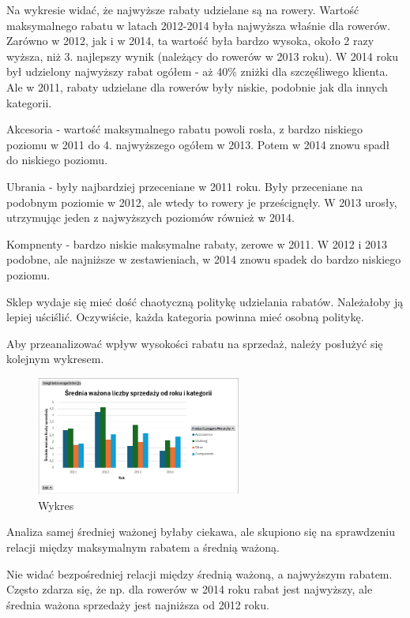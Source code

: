 \documentclass[a4paper,12pt]{article}
\begin{document}
Na wykresie widać, że najwyższe rabaty udzielane są na rowery. Wartość maksymalnego rabatu w latach 2012-2014 była najwyższa właśnie dla rowerów. Zarówno w 2012, jak i w 2014, ta wartość była bardzo wysoka, około 2 razy wyższa, niż 3. najlepszy wynik (należący do rowerów w 2013 roku). W 2014 roku był udzielony najwyższy rabat ogółem - aż 40\% zniżki dla szczęśliwego klienta.
Ale w 2011, rabaty udzielane dla rowerów były niskie, podobnie jak dla innych kategorii.

Akcesoria - wartość maksymalnego rabatu powoli rosła, z bardzo niskiego poziomu w 2011 do 4. najwyższego ogółem w 2013. Potem w 2014 znowu spadł do niskiego poziomu.

Ubrania - były najbardziej przeceniane w 2011 roku. Były przeceniane na podobnym poziomie w 2012, ale wtedy to rowery je prześcignęły. W 2013 urosły, utrzymując jeden z najwyższych poziomów również w 2014.

Kompnenty - bardzo niskie maksymalne rabaty, zerowe w 2011. W 2012 i 2013 podobne, ale najniższe w zestawieniach, w 2014 znowu spadek do bardzo niskiego poziomu.

Sklep wydaje się mieć dość chaotyczną politykę udzielania rabatów. Należałoby ją lepiej uściślić. Oczywiście, każda kategoria powinna mieć osobną politykę.

Aby przeanalizować wpływ wysokości rabatu na sprzedaż, należy posłużyć się kolejnym wykresem.

\begin{figure}[H]
  \centering
  \includegraphics[width=0.6\textwidth]{weighted_sales.png}
  \caption{Wykres}
\end{figure}

Analiza samej średniej ważonej byłaby ciekawa, ale skupiono się na sprawdzeniu relacji między maksymalnym rabatem a średnią ważoną.

Nie widać bezpośredniej relacji między średnią ważoną, a najwyższym rabatem. Często zdarza się, że np. dla rowerów w 2014 roku rabat jest najwyższy, ale średnia ważona sprzedaży jest najniższa od 2012 roku.
\end{document}
